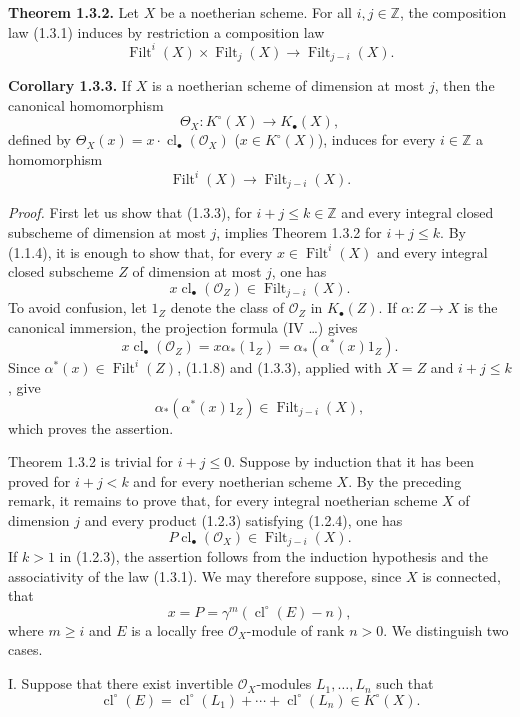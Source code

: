 \documentclass[11pt]{article}
\providecommand{\Filt}{\operatorname{Filt}}
\providecommand{\cl}{\operatorname{cl}}
\begin{document}
\textbf{Theorem 1.3.2.}
Let $X$ be a noetherian scheme. For all $i,j\in\mathbb Z$, the composition law
(1.3.1) induces by restriction a composition law
\begin{equation}\tag{1.3.3}
\Filt^i(X)\times\Filt_j(X)\longrightarrow\Filt_{j-i}(X).
\end{equation}

\textbf{Corollary 1.3.3.}
If $X$ is a noetherian scheme of dimension at most $j$, then the canonical
homomorphism
\[
\Theta_X:K^\circ(X)\longrightarrow K_\bullet(X),
\]
defined by $\Theta_X(x)=x\cdot\cl_\bullet(\mathcal O_X)$
($x\in K^\circ(X)$), induces for every $i\in\mathbb Z$ a homomorphism
\[
\Filt^i(X)\longrightarrow\Filt_{j-i}(X).
\]

\emph{Proof.}
First let us show that (1.3.3), for $i+j\leq k\in\mathbb Z$ and every integral
closed subscheme of dimension at most $j$, implies Theorem 1.3.2 for
$i+j\leq k$. By (1.1.4), it is enough to show that, for every
$x\in\Filt^i(X)$ and every integral closed subscheme $Z$ of dimension at most
$j$, one has
\[
x\cl_\bullet(\mathcal O_Z)\in\Filt_{j-i}(X).
\]
To avoid confusion, let $1_Z$ denote the class of $\mathcal O_Z$ in
$K_\bullet(Z)$. If $\alpha:Z\to X$ is the canonical immersion, the projection
formula (IV \ldots) gives
\[
x\cl_\bullet(\mathcal O_Z)
=x\alpha_*(1_Z)
=\alpha_*(\alpha^*(x)1_Z).
\]
Since $\alpha^*(x)\in\Filt^i(Z)$, (1.1.8) and (1.3.3), applied with $X=Z$
and $i+j\leq k$, give
\[
\alpha_*(\alpha^*(x)1_Z)\in\Filt_{j-i}(X),
\]
which proves the assertion.

Theorem 1.3.2 is trivial for $i+j\leq0$. Suppose by induction that it has been
proved for $i+j<k$ and for every noetherian scheme $X$. By the preceding
remark, it remains to prove that, for every integral noetherian scheme $X$ of
dimension $j$ and every product (1.2.3) satisfying (1.2.4), one has
\begin{equation}\tag{1.3.4}
P\cl_\bullet(\mathcal O_X)\in\Filt_{j-i}(X).
\end{equation}
If $k>1$ in (1.2.3), the assertion follows from the induction hypothesis and
the associativity of the law (1.3.1). We may therefore suppose, since $X$ is
connected, that
\begin{equation}\tag{1.3.5}
x=P=\gamma^m(\cl^\circ(E)-n),
\end{equation}
where $m\geq i$ and $E$ is a locally free $\mathcal O_X$-module of rank
$n>0$. We distinguish two cases.

I. Suppose that there exist invertible $\mathcal O_X$-modules
$L_1,\ldots,L_n$ such that
\[
\cl^\circ(E)=\cl^\circ(L_1)+\cdots+\cl^\circ(L_n)\in K^\circ(X).
\]
\end{document}
